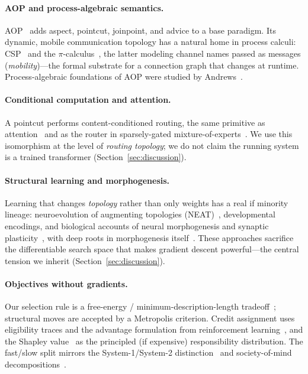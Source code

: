 \documentclass[11pt]{article}
\theoremstyle{definition}
\begin{document}
\paragraph{AOP and process-algebraic semantics.}
AOP~\citep{kiczales1997} adds aspect, pointcut, joinpoint, and advice to a
base paradigm. Its dynamic, mobile communication topology has a natural
home in process calculi: CSP~\citep{hoare1985} and the
$\pi$-calculus~\citep{milner1999}, the latter modeling channel names passed
as messages (\emph{mobility})---the formal substrate for a connection graph
that changes at runtime. Process-algebraic foundations of AOP were studied
by Andrews~\citep{andrews2001}.

\paragraph{Conditional computation and attention.}
A pointcut performs content-conditioned routing, the same primitive as
attention~\citep{vaswani2017} and as the router in sparsely-gated
mixture-of-experts~\citep{shazeer2017}. We use this isomorphism at the level
of \emph{routing topology}; we do not claim the running system is a trained
transformer (Section~\ref{sec:discussion}).

\paragraph{Structural learning and morphogenesis.}
Learning that changes \emph{topology} rather than only weights has a real if
minority lineage: neuroevolution of augmenting topologies
(NEAT)~\citep{stanley2002}, developmental encodings, and biological accounts
of neural morphogenesis and synaptic plasticity~\citep{floreano2001}, with
deep roots in morphogenesis itself~\citep{turing1952}. These approaches
sacrifice the differentiable search space that makes gradient descent
powerful---the central tension we inherit (Section~\ref{sec:discussion}).

\paragraph{Objectives without gradients.}
Our selection rule is a free-energy / minimum-description-length
tradeoff~\citep{rissanen1978,friston2010}; structural moves are accepted by a
Metropolis criterion. Credit assignment uses eligibility traces and the
advantage formulation from reinforcement learning~\citep{suttonbarto2018,
williams1992}, and the Shapley value~\citep{shapley1953} as the principled
(if expensive) responsibility distribution. The fast/slow split mirrors the
System-1/System-2 distinction~\citep{kahneman2011} and society-of-mind
decompositions~\citep{minsky1986}.
\end{document}
